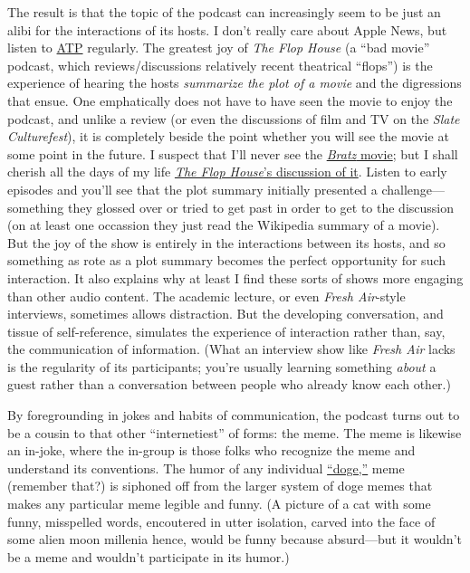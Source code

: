 \documentclass[
  12pt,
]{article}
\begin{document}
The result is that the topic of the podcast can increasingly seem to be
just an alibi for the interactions of its hosts. I don't really care
about Apple News, but listen to \href{http://atp.fm}{ATP} regularly. The
greatest joy of \emph{The Flop House} (a ``bad movie'' podcast, which
reviews/discussions relatively recent theatrical ``flops'') is the
experience of hearing the hosts \emph{summarize the plot of a movie} and
the digressions that ensue. One emphatically does not have to have seen
the movie to enjoy the podcast, and unlike a review (or even the
discussions of film and TV on the \emph{Slate Culturefest}), it is
completely beside the point whether you will see the movie at some point
in the future. I suspect that I'll never see the
\href{http://www.imdb.com/title/tt0804452/}{\emph{Bratz} movie}; but I
shall cherish all the days of my life
\href{http://www.flophousepodcast.com/2008/04/episode-14-bratz/}{\emph{The
Flop House}'s discussion of it}. Listen to early episodes and you'll see
that the plot summary initially presented a challenge---something they
glossed over or tried to get past in order to get to the discussion (on
at least one occassion they just read the Wikipedia summary of a movie).
But the joy of the show is entirely in the interactions between its
hosts, and so something as rote as a plot summary becomes the perfect
opportunity for such interaction. It also explains why at least I find
these sorts of shows more engaging than other audio content. The
academic lecture, or even \emph{Fresh Air}-style interviews, sometimes
allows distraction. But the developing conversation, and tissue of
self-reference, simulates the experience of interaction rather than,
say, the communication of information. (What an interview show like
\emph{Fresh Air} lacks is the regularity of its participants; you're
usually learning something \emph{about} a guest rather than a
conversation between people who already know each other.)

By foregrounding in jokes and habits of communication, the podcast turns
out to be a cousin to that other ``internetiest'' of forms: the meme.
The meme is likewise an in-joke, where the in-group is those folks who
recognize the meme and understand its conventions. The humor of any
individual \href{http://knowyourmeme.com/memes/doge}{``doge,''} meme
(remember that?) is siphoned off from the larger system of doge memes
that makes any particular meme legible and funny. (A picture of a cat
with some funny, misspelled words, encoutered in utter isolation, carved
into the face of some alien moon millenia hence, would be funny because
absurd---but it wouldn't be a meme and wouldn't participate in its
humor.)
\end{document}
